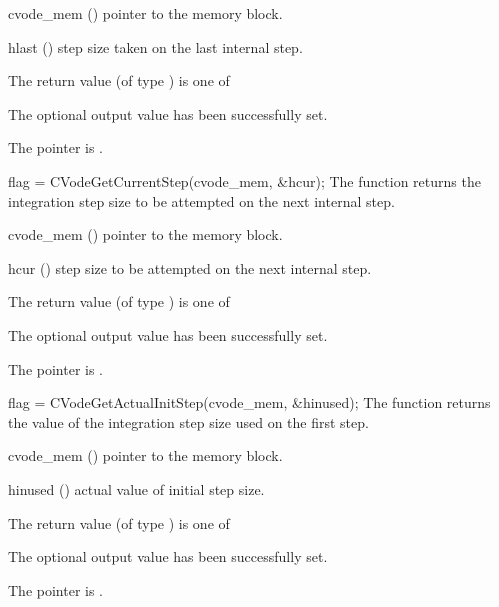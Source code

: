 {
  \begin{args}
  \item[cvode\_mem] ()
    pointer to the {\cvode} memory block.
  \item[hlast] ()
    step size taken on the last internal step.
  \end{args}
}
{
  The return value  (of type ) is one of
  \begin{args}
  \item[\Id{CV\_SUCCESS}]
    The optional output value has been successfully set.
  \item[\Id{CV\_MEM\_NULL}]
    The  pointer is .
  \end{args}
}
{}
{
  flag = CVodeGetCurrentStep(cvode\_mem, \&hcur);
}
{
  The function  returns the
  integration step size to be attempted on the next internal step.
}
{
  \begin{args}
  \item[cvode\_mem] ()
    pointer to the {\cvode} memory block.
  \item[hcur] ()
    step size to be attempted on the next internal step.
  \end{args}
}
{
  The return value  (of type ) is one of
  \begin{args}
  \item[\Id{CV\_SUCCESS}]
    The optional output value has been successfully set.
  \item[\Id{CV\_MEM\_NULL}]
    The  pointer is .
  \end{args}
}
{}
{
  flag = CVodeGetActualInitStep(cvode\_mem, \&hinused);
}
{
  The function  returns the
  value of the integration step size used on the first step.
}
{
  \begin{args}
  \item[cvode\_mem] ()
    pointer to the {\cvode} memory block.
  \item[hinused] ()
    actual value of initial step size.
  \end{args}
}
{
  The return value  (of type ) is one of
  \begin{args}
  \item[\Id{CV\_SUCCESS}]
    The optional output value has been successfully set.
  \item[\Id{CV\_MEM\_NULL}]
    The  pointer is .
  \end{args}
}
